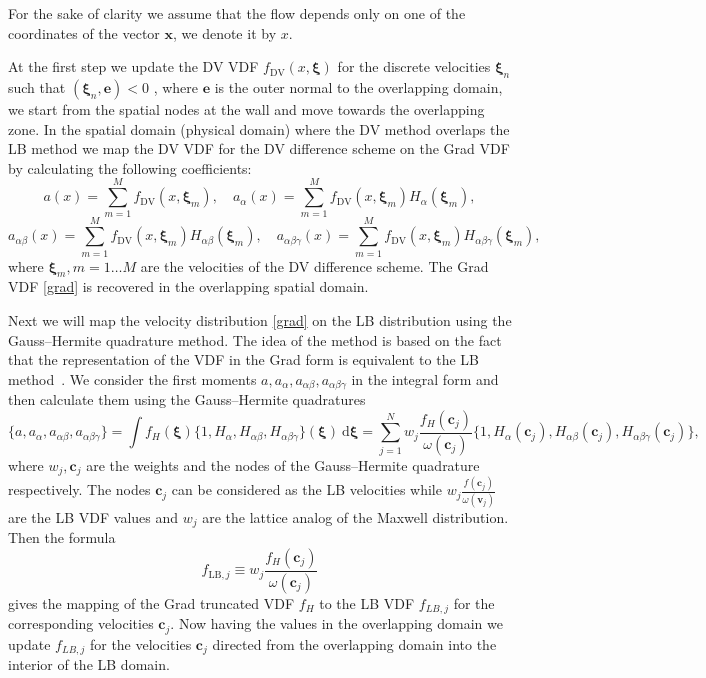 \documentclass{aip-cp}
\newcommand{\dd}{\mathrm{d}}
\newcommand{\dxi}{\:\boldsymbol{\dd\xi}}
\newcommand{\bxi}{\boldsymbol{\xi}}
\newcommand{\bv}{\boldsymbol{v}}
\newcommand{\bc}{\boldsymbol{c}}
\newcommand{\bx}{\boldsymbol{x}}
\begin{document}
For the sake of clarity we assume that the flow depends only on one of the coordinates of the vector $\bx$, we denote it by $x$.

At the first step we update the DV VDF $f_\mathrm{DV}(x,\bxi)$ for the discrete velocities $\bxi_n$ such that $(\bxi_n,\mathbf{e})<0$ , where $\mathbf{e}$ is the outer normal to the overlapping domain, we start from the spatial nodes at the wall and move towards the overlapping zone.
In the spatial domain (physical domain) where the DV method overlaps the LB method we map the DV VDF for the DV difference scheme on the Grad VDF by calculating the following coefficients:
$$
a(x)=\sum_{m=1}^M f_\mathrm{DV}(x,\bxi_m),   \quad a_\alpha(x)=\sum_{m=1}^Mf_\mathrm{DV}(x,\bxi_m)H_\alpha(\bxi_m),
$$
$$
a_{\alpha\beta }(x)=\sum_{m=1}^Mf_\mathrm{DV}(x,\bxi_m)H_{\alpha\beta}(\bxi_m), \quad
a_{\alpha\beta \gamma}(x)=\sum_{m=1}^Mf_\mathrm{DV}(x,\bxi_m)H_{\alpha\beta \gamma}(\bxi_m),
$$
where $\bxi_m, m=1 \ldots M$ are the velocities of the DV difference scheme.
The Grad VDF \eqref{grad} is recovered in the overlapping spatial domain.

Next we will map the velocity distribution \eqref{grad} on the LB distribution using the Gauss--Hermite quadrature method.
The idea of the method is based on the fact that the representation of the VDF in the Grad form
is equivalent to the LB method~\cite{He1997, Shan1998}.
We consider the first moments $a,a_{\alpha},a_{\alpha\beta}, a_{\alpha\beta \gamma}$ in the integral form
and then calculate them using the Gauss--Hermite quadratures
$$
\{ a, a_{\alpha}, a_{\alpha\beta}, a_{\alpha\beta\gamma} \} =
    \int f_H(\bxi)\{ 1, H_{\alpha}, H_{\alpha\beta}, H_{\alpha\beta\gamma} \}(\bxi)\dxi =
    \sum_{j=1}^N w_j\frac{f_H(\boldsymbol{c}_j)}{\omega(\bc_j)}
    \{1, H_{\alpha}(\bc_j), H_{\alpha\beta}(\bc_j), H_{\alpha\beta\gamma}(\bc_j) \},
$$
where $w_j, \boldsymbol{c}_j$ are the weights and the nodes of the Gauss--Hermite quadrature respectively.
The nodes $\bc_j$ can be considered as the LB velocities
while $ w_j\frac{f(\bc_j)}{\omega(\bv_j)}$ are the LB VDF values
and $w_j$ are the lattice analog of the Maxwell distribution.
Then the formula
\begin{equation}\label{grad_to_latt}
    f_{\mathrm{LB},j}\equiv w_j\frac{f_H(\bc_j)}{\omega(\bc_j)}
\end{equation}
gives the mapping of the Grad truncated VDF $f_H$ to the LB VDF $f_{LB,j}$ for the corresponding velocities $\bc_j$.
Now having the values in the overlapping domain we update $f_{LB,j}$ for the velocities $\bc_j$
directed from the overlapping domain into the interior of the LB domain.
\end{document}
